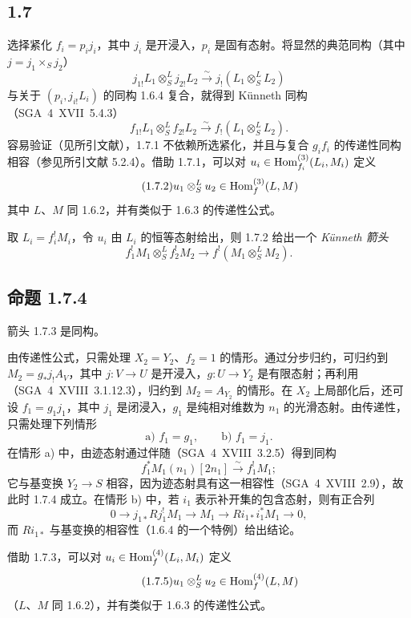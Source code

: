 \subsection*{1.7}
选择紧化 $f_i=p_i j_i$，其中 $j_i$ 是开浸入，$p_i$ 是固有态射。将显然的典范同构（其中 $j=j_1\times_Sj_2$）
\[
j_{1!}L_1\otimes^L_Sj_{2!}L_2\xrightarrow{\sim}j_{!}(L_1\otimes^L_SL_2)
\]
与关于 $(p_i,j_{i!}L_i)$ 的同构 1.6.4 复合，就得到 Künneth 同构（SGA~4~XVII~5.4.3）
\begin{equation}\tag{1.7.1}
f_{1!}L_1\otimes^L_Sf_{2!}L_2\xrightarrow{\sim}f_{!}(L_1\otimes^L_SL_2).
\end{equation}
容易验证（见所引文献），1.7.1 不依赖所选紧化，并且与复合 $g_if_i$ 的传递性同构相容（参见所引文献 5.2.4）。借助 1.7.1，可以对 $u_i\in\operatorname{Hom}_{f_i}^{(3)}(L_i,M_i)$ 定义
\begin{equation}\tag{1.7.2}
u_1\otimes^L_Su_2\in\operatorname{Hom}_f^{(3)}(L,M)
\end{equation}
其中 $L$、$M$ 同 1.6.2，并有类似于 1.6.3 的传递性公式。

取 $L_i=f_i^{!}M_i$，令 $u_i$ 由 $L_i$ 的恒等态射给出，则 1.7.2 给出一个 \emph{Künneth 箭头}
\begin{equation}\tag{1.7.3}
f_1^{!}M_1\otimes^L_Sf_2^{!}M_2\longrightarrow f^{!}(M_1\otimes^L_SM_2).
\end{equation}

\subsection*{命题 1.7.4}
箭头 1.7.3 是同构。

由传递性公式，只需处理 $X_2=Y_2$、$f_2=1$ 的情形。通过分步归约，可归约到 $M_2=g_{*}j_{!}A_V$，其中 $j:V\to U$ 是开浸入，$g:U\to Y_2$ 是有限态射；再利用（SGA~4~XVIII~3.1.12.3），归约到 $M_2=A_{Y_2}$ 的情形。在 $X_2$ 上局部化后，还可设 $f_1=g_1j_1$，其中 $j_1$ 是闭浸入，$g_1$ 是纯相对维数为 $n_1$ 的光滑态射。由传递性，只需处理下列情形
\[
\text{a) } f_1=g_1,\qquad \text{b) } f_1=j_1.
\]
在情形 a) 中，由迹态射通过伴随（SGA~4~XVIII~3.2.5）得到同构
\[
f_1^{*}M_1(n_1)[2n_1]\xrightarrow{\sim}f_1^{!}M_1;
\]
它与基变换 $Y_2\to S$ 相容，因为迹态射具有这一相容性（SGA~4~XVIII~2.9），故此时 1.7.4 成立。在情形 b) 中，若 $i_1$ 表示补开集的包含态射，则有正合列
\[
0\longrightarrow j_{1*}Rj_1^{!}M_1\longrightarrow M_1\longrightarrow Ri_{1*}i_1^{*}M_1\longrightarrow0,
\]
而 $Ri_{1*}$ 与基变换的相容性（1.6.4 的一个特例）给出结论。

借助 1.7.3，可以对 $u_i\in\operatorname{Hom}_f^{(4)}(L_i,M_i)$ 定义
\begin{equation}\tag{1.7.5}
u_1\otimes^L_Su_2\in\operatorname{Hom}_f^{(4)}(L,M)
\end{equation}
（$L$、$M$ 同 1.6.2），并有类似于 1.6.3 的传递性公式。

